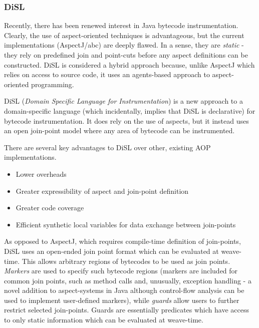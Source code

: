                 \subsubsection{DiSL} \label{sec:instrumentation/hybrid/disl}
                Recently, there has been renewed interest in Java bytecode instrumentation. Clearly, the use of aspect-oriented techniques is advantageous, but the current implementations (AspectJ/abc) are deeply flawed. In a sense, they are \textit{static} - they rely on predefined join and point-cuts before any aspect definitions can be constructed. DiSL is considered a hybrid approach because, unlike AspectJ which relies on access to source code, it uses an agents-based approach to aspect-oriented programming.

                DiSL (\textit{Domain Specific Language for Instrumentation}) \citep{Marek2012} is a new approach to a domain-specific language (which incidentally, implies that DiSL is declarative) for bytecode instrumentation. It does rely on the use of aspects, but it instead uses an open join-point model where any area of bytecode can be instrumented.
                
                There are several key advantages to DiSL over other, existing AOP implementations.

                \begin{itemize}
                        \item Lower overheads
                        \item Greater expressibility of aspect and join-point definition
                        \item Greater code coverage
                        \item Efficient synthetic local variables for data exchange between join-points
                \end{itemize}

                As opposed to AspectJ, which requires compile-time definition of join-points, DiSL uses an open-ended join point format which can be evaluated at weave-time. This allows arbitrary regions of bytecodes to be used as join points. \textit{Markers} are used to specify such bytecode regions (markers are included for common join points, such as method calls and, unusually, exception handling - a novel addition to aspect-systems in Java although control-flow analysis can be used to implement user-defined markers), while \textit{guards} allow users to further restrict selected join-points. Guards are essentially predicates which have access to only static information which can be evaluated at weave-time.

